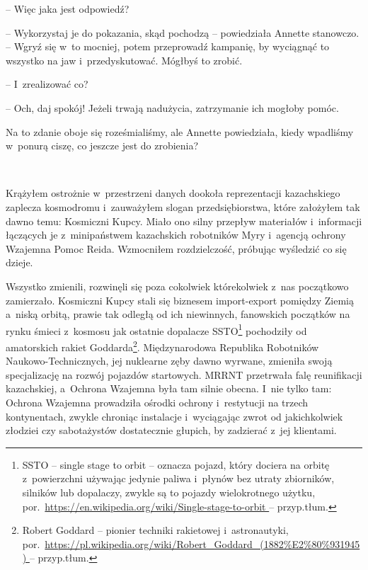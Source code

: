 \documentclass[oneside,polish,11pt,sfheadings]{mwbk}
\begin{document}
-- Więc jaka jest odpowiedź?

-- Wykorzystaj je do pokazania, skąd pochodzą -- powiedziała Annette
stanowczo. -- Wgryź się w~to mocniej, potem przeprowadź kampanię, by
wyciągnąć to wszystko na jaw i~przedyskutować. Mógłbyś to zrobić.

-- I~zrealizować co?

-- Och, daj spokój! Jeżeli trwają nadużycia, zatrzymanie ich mogłoby
pomóc.

Na to zdanie oboje się roześmialiśmy, ale Annette powiedziała, kiedy
wpadliśmy w~ponurą ciszę, co jeszcze jest do zrobienia?

~

Krążyłem ostrożnie w~przestrzeni danych dookoła reprezentacji
kazachskiego zaplecza kosmodromu i~zauważyłem slogan przedsiębiorstwa,
które założyłem tak dawno temu: Kosmiczni Kupcy. Miało ono silny
przepływ materiałów i~informacji łączących je z~minipaństwem kazachskich
robotników Myry i~agencją ochrony Wzajemna Pomoc Reida. Wzmocniłem
rozdzielczość, próbując wyśledzić co się dzieje.

Wszystko zmienili, rozwinęli się poza cokolwiek którekolwiek z~nas
początkowo zamierzało. Kosmiczni Kupcy stali się biznesem import-export
pomiędzy Ziemią a~niską orbitą, prawie tak odległą od ich niewinnych,
fanowskich początków na rynku śmieci z~kosmosu jak ostatnie dopalacze
SSTO\footnote{ SSTO -- single stage to orbit -- oznacza pojazd, który dociera na
orbitę z~powierzchni używając jedynie paliwa i~płynów bez utraty
zbiorników, silników lub dopalaczy, zwykle są to pojazdy wielokrotnego
użytku, por.~\url{https://en.wikipedia.org/wiki/Single-stage-to-orbit
} -- przyp.tłum.} pochodziły od amatorskich rakiet Goddarda\footnote{Robert
Goddard -- pionier techniki rakietowej i~astronautyki,
por.~\url{https://pl.wikipedia.org/wiki/Robert_Goddard_(1882\%E2\%80\%931945)
} -- przyp.tłum.}. Międzynarodowa Republika Robotników
Naukowo-Technicznych, jej nuklearne zęby dawno wyrwane, zmieniła swoją
specjalizację na rozwój pojazdów startowych. MRRNT przetrwała falę
reunifikacji kazachskiej, a~Ochrona Wzajemna była tam silnie obecna. I~nie tylko tam: Ochrona Wzajemna prowadziła ośrodki ochrony i~restytucji
na trzech kontynentach, zwykle chroniąc instalacje i~wyciągając zwrot od
jakichkolwiek złodziei czy sabotażystów dostatecznie głupich, by
zadzierać z~jej klientami.
\end{document}
